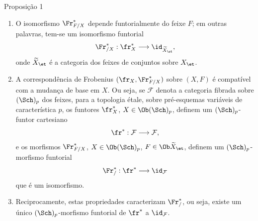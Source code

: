 \begin{statement}{Proposição 1}
\begin{enumerate}[label=\alph*)]
\item O isomorfismo $\Fr^*_{F/X}$ depende funtorialmente do feixe $F$; em outras palavras, tem-se um isomorfismo funtorial
\[
\Fr^*_{/X}:\fr_X^*\longrightarrow \id_{\widetilde X_{\et}},
\]
onde $\widetilde X_{\et}$ é a categoria dos feixes de conjuntos sobre $X_{\et}$.
\item A correspondência de Frobenius $(\fr_X,\Fr^*_{F/X})$ sobre $(X,F)$ é compatível com a mudança de base em $X$. Ou seja, se $\mathcal F$ denota a categoria fibrada sobre $(\Sch)_p$ dos feixes, para a topologia étale, sobre pré-esquemas variáveis de característica $p$, os funtores $\fr_X^*$, $X\in\Ob(\Sch)_p$, definem um $(\Sch)_p$-funtor cartesiano
\[
\fr^*: \mathcal F\longrightarrow\mathcal F,
\]
e os morfismos $\Fr^*_{F/X}$, $X\in\Ob(\Sch)_p$, $F\in\Ob\widetilde X_{\et}$, definem um $(\Sch)_p$-morfismo funtorial
\[
\Fr^*_{/}:\fr^*\longrightarrow\id_{\mathcal F}
\]
que é um isomorfismo.
\item Reciprocamente, estas propriedades caracterizam $\Fr^*_{/}$, ou seja, existe um único $(\Sch)_p$-morfismo funtorial de $\fr^*$ a $\id_{\mathcal F}$.
\end{enumerate}
\end{statement}
